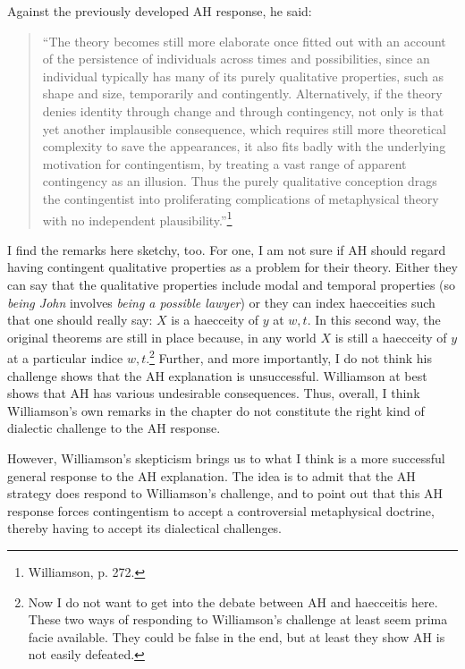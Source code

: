 Against the previously developed AH response, he said: 
\begin{quote}
``The theory becomes still more elaborate once fitted out with an account of the persistence of individuals across times and possibilities, since an individual typically has many of its purely qualitative properties, such as shape and size, temporarily and contingently. Alternatively, if the theory denies identity through change and through contingency, not only is that yet another implausible consequence, which requires still more theoretical complexity to save the appearances, it also fits badly with the underlying motivation for contingentism, by treating a vast range of apparent contingency as an illusion. Thus the purely qualitative conception drags the contingentist into proliferating complications of metaphysical theory with no independent plausibility.''\footnote{Williamson, p. 272.}
\end{quote}
I find the remarks here sketchy, too. 
For one, I am not sure if AH should regard having contingent qualitative properties as a problem for their theory. Either they can say that the qualitative properties include modal and temporal properties (so \emph{being John} involves \emph{being a possible lawyer}) or they can index haecceities such that one should really say: $X$ is a haecceity of $y$ at $w,t$. In this second way, the original theorems are still in place because, in any world $X$ is still a haecceity of $y$ at a particular indice $w,t$.\footnote{Now I do not want to get into the debate between AH and haecceitis here. These two ways of responding to Williamson's challenge at least seem prima facie available. They could be false in the end, but at least they show AH is not easily defeated. } 
Further, and more importantly, I do not think his challenge shows that the AH explanation is unsuccessful. Williamson at best shows that AH has various undesirable consequences.
Thus, overall, I think Williamson's own remarks in the chapter do not constitute the right kind of dialectic challenge to the AH response.  

However, Williamson's skepticism brings us to what I think is a more successful general response to the AH explanation. The idea is to admit that the AH strategy does respond to Williamson's challenge, and to point out that this AH response forces contingentism to accept a controversial metaphysical doctrine, thereby having to accept its dialectical challenges. 

